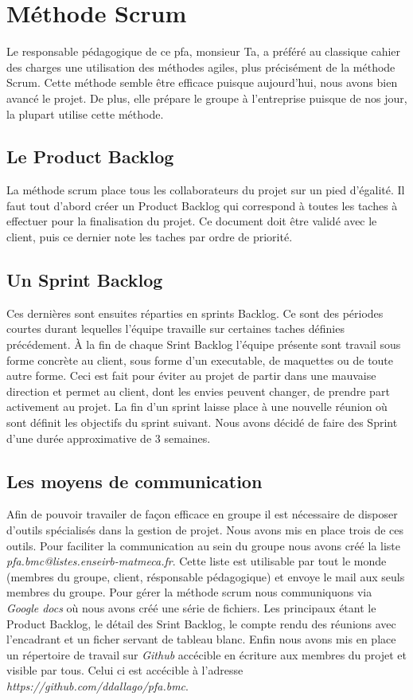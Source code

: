 \section{Méthode Scrum}
Le responsable pédagogique de ce pfa, monsieur Ta, a préféré au classique cahier des charges une utilisation des méthodes agiles, plus précisément de la méthode Scrum.
Cette méthode semble être efficace puisque aujourd'hui, nous avons bien avancé le projet. De plus, elle prépare le groupe à l'entreprise puisque de nos jour, la plupart utilise cette méthode.

\subsection*{Le Product Backlog}
La méthode scrum place tous les collaborateurs du projet sur un pied d'égalité. Il faut tout d'abord créer un Product Backlog qui correspond à toutes les taches à effectuer pour la finalisation du projet.
Ce document doit être validé avec le client, puis ce dernier note les taches par ordre de priorité.

\subsection*{Un Sprint Backlog}
Ces dernières sont ensuites réparties en sprints Backlog. Ce sont des périodes courtes durant lequelles l'équipe travaille sur certaines taches définies précédement. 
À la fin de chaque Srint Backlog l'équipe présente sont travail sous forme concrète au client, sous forme d'un executable, de maquettes ou de toute autre forme.
Ceci est fait pour éviter au projet de partir dans une mauvaise direction et permet au client, dont les envies peuvent changer, de prendre part activement au projet.
La fin d'un sprint laisse place à une nouvelle réunion où sont définit les objectifs du sprint suivant.
Nous avons décidé de faire des Sprint d'une durée approximative de 3 semaines.

\subsection*{Les moyens de communication}
Afin de pouvoir travailer de façon efficace en groupe il est nécessaire de disposer d'outils spécialisés dans la gestion de projet.
Nous avons mis en place trois de ces outils.
Pour faciliter la communication au sein du groupe nous avons créé la liste \textit{pfa.bmc@listes.enseirb-matmeca.fr}. Cette liste est utilisable par tout le monde (membres du groupe, client, résponsable pédagogique) et envoye le mail aux seuls membres du groupe.
Pour gérer la méthode scrum nous communiquons via \textit{Google docs} où nous avons créé une série de fichiers. Les principaux étant le Product Backlog, le détail des Srint Backlog, le compte rendu des réunions avec l'encadrant et un ficher servant de tableau blanc.
Enfin nous avons mis en place un répertoire de travail sur \textit{Github} accécible en écriture aux membres du projet et visible par tous. Celui ci est accécible à l'adresse \textit{https://github.com/ddallago/pfa.bmc}.

